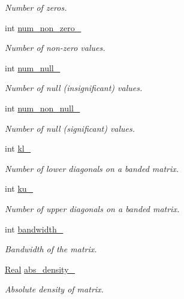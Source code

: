 \begin{DoxyCompactItemize}
\begin{DoxyCompactList}\small\item\em Number of zeros. \end{DoxyCompactList}\item 
int \hyperlink{classmtk_1_1Matrix_a064d611ebb949858441180d6ff2acaee}{num\-\_\-non\-\_\-zero\-\_\-}
\begin{DoxyCompactList}\small\item\em Number of non-\/zero values. \end{DoxyCompactList}\item 
int \hyperlink{classmtk_1_1Matrix_aec5bf3cd2e62d7a38412e1dca35cf822}{num\-\_\-null\-\_\-}
\begin{DoxyCompactList}\small\item\em Number of null (insignificant) values. \end{DoxyCompactList}\item 
int \hyperlink{classmtk_1_1Matrix_a32d782bd784bea3bb3e5fd55a583b4b7}{num\-\_\-non\-\_\-null\-\_\-}
\begin{DoxyCompactList}\small\item\em Number of null (significant) values. \end{DoxyCompactList}\item 
int \hyperlink{classmtk_1_1Matrix_a45c2498d0b6d515c72c2e631508acd7d}{kl\-\_\-}
\begin{DoxyCompactList}\small\item\em Number of lower diagonals on a banded matrix. \end{DoxyCompactList}\item 
int \hyperlink{classmtk_1_1Matrix_afdb4436c4c4c6deaed608a06026179c9}{ku\-\_\-}
\begin{DoxyCompactList}\small\item\em Number of upper diagonals on a banded matrix. \end{DoxyCompactList}\item 
int \hyperlink{classmtk_1_1Matrix_a892449ddacb81d089818967e65979786}{bandwidth\-\_\-}
\begin{DoxyCompactList}\small\item\em Bandwidth of the matrix. \end{DoxyCompactList}\item 
\hyperlink{group__c01-roots_gac080bbbf5cbb5502c9f00405f894857d}{Real} \hyperlink{classmtk_1_1Matrix_abdf2ac1bbb6c4432cb7caf06e4ca0f26}{abs\-\_\-density\-\_\-}
\begin{DoxyCompactList}\small\item\em Absolute density of matrix. \end{DoxyCompactList}\item 

\end{DoxyCompactItemize}
